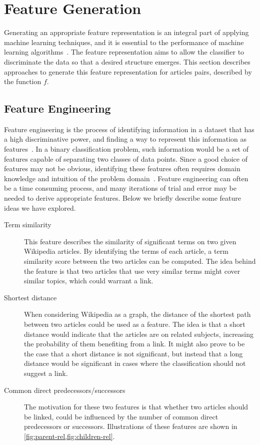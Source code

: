 \section{Feature Generation}\label{sec:feature_generation}
Generating an appropriate feature representation is an integral part of applying machine learning techniques, and it is essential to the performance of machine learning algorithms~\cite{ng-lecture}. The feature representation aims to allow the classifier to discriminate the data so that a desired structure emerges. This section describes approaches to generate this feature representation for articles pairs, described by the function $f$.

\subsection{Feature Engineering}\label{sec:feature_engineering}
Feature engineering is the process of identifying information in a dataset that has a high discriminative power, and finding a way to represent this information as features~\cite{domingos2012few}. In a binary classification problem, such information would be a set of features capable of separating two classes of data points. Since a good choice of features may not be obvious, identifying these features often requires domain knowledge and intuition of the problem domain~\cite{ng-lecture,domingos2012few}. Feature engineering can often be a time consuming process, and many iterations of trial and error may be needed to derive appropriate features. Below we briefly describe some feature ideas we have explored.

\begin{description}
    \item[Term similarity] This feature describes the similarity of significant terms on two given Wikipedia articles. By identifying the terms of each article, a term similarity score between the two articles can be computed. The idea behind the feature is that two articles that use very similar terms might cover similar topics, which could warrant a link.
    \item[Shortest distance] When considering Wikipedia as a graph, the distance of the shortest path between two articles could be used as a feature. The idea is that a short distance would indicate that the articles are on related subjects, increasing the probability of them benefiting from a link. It might also prove to be the case that a short distance is not significant, but instead that a long distance would be significant in cases where the classification should not suggest a link.
    \item[Common direct predecessors/successors] The motivation for these two features is that whether two articles should be linked, could be influenced by the number of common direct predecessors or successors. Illustrations of these features are shown in \cref{fig:parent-rel,fig:children-rel}.
\end{description}

